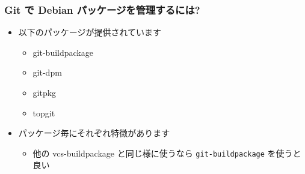 \documentclass[10pt,final,c,dvipdfmx,cjk,colorlinks=false]{beamer}
\begin{document}
\begin{frame}
\frametitle{Git で Debian パッケージを管理するには?}
\label{sec-1-6}


\begin{itemize}
\item 以下のパッケージが提供されています
\begin{itemize}
\item git-buildpackage
\item git-dpm
\item gitpkg
\item topgit
\end{itemize}
\item パッケージ毎にそれぞれ特徴があります
\begin{itemize}
\item 他の vcs-buildpackage と同じ様に使うなら
    \texttt{git-buildpackage} を使うと良い
\end{itemize}
\end{itemize}
\end{frame}
\end{document}

